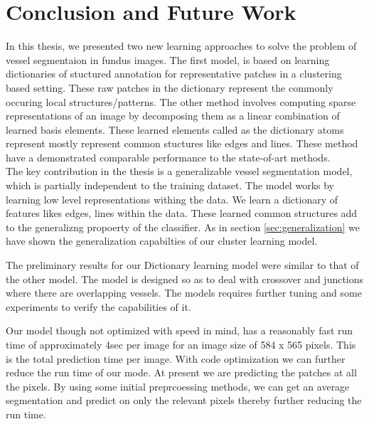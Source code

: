 \chapter{Conclusion and Future Work}  %

\ifpdf
    \graphicspath{{Chapter4/Figs/Raster/}{Chapter4/Figs/PDF/}{Chapter4/Figs/}}
\else
    \graphicspath{{Chapter4/Figs/Vector/}{Chapter4/Figs/}}
\fi
In this thesis, we presented two new learning approaches to solve the problem of vessel segmentaion in fundus images. The first model, is  based on learning dictionaries of stuctured annotation for representative patches in a clustering based setting. These raw patches in the dictionary represent the commonly occuring local structures/patterns. The other method involves computing sparse representations of an image by decomposing them as a linear combination of learned basis elements. These learned elements called as the dictionary atoms represent mostly represent common stuctures like edges and lines. These method have a demonstrated comparable performance to the state-of-art methods.\\

The key contribution in the thesis is a generalizable vessel segmentation model, which is partially independent to the training dataset. The model works by learning low level representations withing the data. We learn a dictionary of features likes edges, lines within the data. These learned common structures add to the generalizng propoerty of the classifier. As in section \ref{sec:generalization} we have shown the generalization capabilties of our cluster learning model.

The preliminary results for our Dictionary learning model were similar to that of the other model. The model is designed so as to deal with crossover and junctions where there are overlapping vessels. The models requires further tuning and some experiments to verify the capabilities of it.

Our model though not optimized with speed in mind, has a reasonably fast run time of approximately 4sec per image for an image size of 584 x 565 pixels. This is the total prediction time per image.  With code optimization we can further reduce the run time of our mode. At present we are predicting the patches at all the pixels. By using some initial preprcoessing methods, we can get an average segmentation and predict on only the relevant pixels thereby further reducing the run time.

